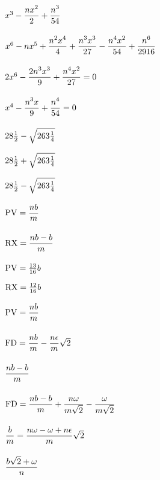 $x^{3} - {\displaystyle\strut {nx^{2}}\over \displaystyle\strut 2} + {\displaystyle\strut n^{3}\over \displaystyle\strut 54}$\par\vfill\eject
$x^{6} - nx^{5} + {\displaystyle\strut {n^{2}x^{4}}\over \displaystyle\strut 4} + {\displaystyle\strut {n^{3}x^{3}}\over \displaystyle\strut 27} - {\displaystyle\strut {n^{4}x^{2}}\over \displaystyle\strut 54} + {\displaystyle\strut n^{6}\over \displaystyle\strut 2916}$\par\vfill\eject
$2x^{6} - {\displaystyle\strut {2n^{3}x^{3}}\over \displaystyle\strut 9} + {\displaystyle\strut {n^{4}x^{2}}\over \displaystyle\strut 27} = 0$\par\vfill\eject
$x^{4} - {\displaystyle\strut {n^{3}x}\over \displaystyle\strut 9} + {\displaystyle\strut n^{4}\over \displaystyle\strut 54} = 0$\par\vfill\eject
$28{{1\over 2}} - \sqrt{263{{1\over 4}}}$\par\vfill\eject
$28{{1\over 2}} + \sqrt{263{{1\over 4}}}$\par\vfill\eject
$28{{1\over 2}}- \sqrt{263{{1\over 4}}}$\par\vfill\eject
${\rm PV} = {\displaystyle\strut nb\over \displaystyle\strut m}$\par\vfill\eject
${\rm RX} = {\displaystyle\strut {nb - b}\over \displaystyle\strut m}$\par\vfill\eject
${\rm PV} = {{13\over 16}}b$\par\vfill\eject
${\rm RX} = {{12\over 16}}b$\par\vfill\eject
${\rm PV} = {\displaystyle\strut nb\over \displaystyle\strut m}$\par\vfill\eject
${\rm FD} = {\displaystyle\strut nb\over \displaystyle\strut m} - {\displaystyle\strut {n \epsilon  }\over \displaystyle\strut m}\sqrt{2}$\par\vfill\eject
${\displaystyle\strut {nb - b}\over \displaystyle\strut m}$\par\vfill\eject
${\rm FD} = {\displaystyle\strut {nb - b}\over \displaystyle\strut m} + {\displaystyle\strut {n \omega  }\over \displaystyle\strut {m\sqrt{2}}} -  {\displaystyle\strut \omega  \over  \displaystyle\strut {m\sqrt{2}}}$\par\vfill\eject
${\displaystyle\strut b\over \displaystyle\strut m} = {\displaystyle\strut {n \omega   -  \omega   + n \epsilon  }\over \displaystyle\strut m}\sqrt{2}$\par\vfill\eject
${\displaystyle\strut {b\sqrt{2} +  \omega  }\over \displaystyle\strut n}$\par\vfill\eject
